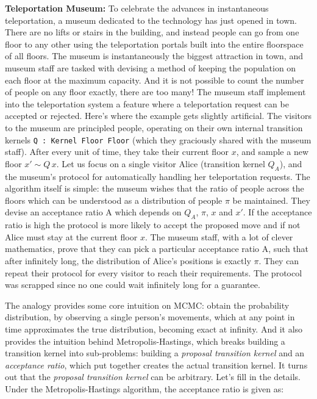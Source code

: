 \textbf{Teleportation Museum: } To celebrate the advances in instantaneous teleportation, a museum dedicated to the technology has just opened in town. There are no lifts
or stairs in the building, and instead people can go from one floor to any other using the teleportation portals built into the entire floorspace of all floors. The museum is instantaneously the biggest
attraction in town, and museum staff are tasked with devising a method of keeping the population on each floor at the maximum capacity. And it is not possible to count
the number of people on any floor exactly, there are too many! The museum staff
implement into the teleportation system a feature where a teleportation request can be accepted or rejected. Here's where the example gets slightly
artificial. The visitors to the museum are principled people, operating on their own internal transition kernels \texttt{Q : Kernel Floor Floor} (which they graciously shared with the museum staff). After
every unit of time, they take their current floor $x$, and sample a new floor $x' \sim Q\, x$.
Let us focus on a single visitor Alice (transition kernel $Q_A$), and the museum's protocol for automatically
handling her teleportation requests. The algorithm itself is simple: the museum wishes that the ratio of people across the floors which can be understood as a distribution of people $\pi$
be maintained. They devise an acceptance ratio A which depends on $Q_A$, $\pi$, $x$ and $x'$. If the acceptance ratio is high the protocol is
more likely to accept the proposed move and if not Alice must stay at the current floor $x$. The museum staff, with a lot of clever mathematics, prove that they can pick
a particular acceptance ratio A, such that after infinitely long, the distribution of Alice's positions is exactly $\pi$. They can repeat their protocol for every visitor
to reach their requirements. The protocol was scrapped since no one could wait infinitely long for a guarantee.

The analogy provides some core intuition on MCMC: obtain the probability distribution, by observing a single person's movements, which at any point in time approximates the true
distribution, becoming exact at infinity. And it also provides the intuition behind Metropolis-Hastings, which breaks building a transition kernel into sub-problems:
building a \emph{proposal transition kernel} and an \emph{acceptance ratio}, which put together creates the actual transition kernel. It turns out that the \emph{proposal transition kernel}
can be arbitrary.
Let's fill in the details. Under the Metropolis-Hastings algorithm, the acceptance ratio is given as:

